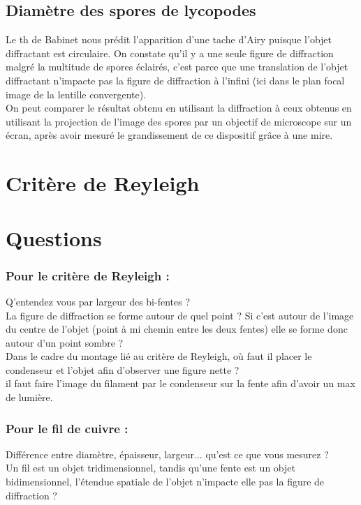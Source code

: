 \documentclass[12pt,prb,aps,epsf]{report}
\begin{document}
\subsection{Diamètre des spores de lycopodes}
Le th de Babinet nous prédit l'apparition d'une tache d'Airy puisque l'objet diffractant est circulaire. On constate qu'il y a une seule figure de diffraction malgré la multitude de spores éclairés, c'est parce que une translation de l'objet diffractant n'impacte pas la figure de diffraction à l'infini (ici dans le plan focal image de la lentille convergente).\\
On peut comparer le résultat obtenu en utilisant la diffraction à ceux obtenus en utilisant la projection de l'image des spores par un objectif de microscope sur un écran, après avoir mesuré le grandissement de ce dispositif grâce à une mire.

\section{Critère de Reyleigh}


\section{Questions}
\subsubsection{Pour le critère de Reyleigh :}
Q'entendez vous par largeur des bi-fentes ?\\

La figure de diffraction se forme autour de quel point ? Si c'est autour de l'image du centre de l'objet (point à mi chemin entre les deux fentes) elle se forme donc autour d'un point sombre ?\\

Dans le cadre du montage lié au critère de Reyleigh, où faut il placer le condenseur et l'objet afin d'observer une figure nette ?\\
il faut faire l'image du filament par le condenseur sur la fente afin d'avoir un max de lumière.

\subsubsection{Pour le fil de cuivre :}
Différence entre diamètre, épaisseur, largeur... qu'est ce que vous mesurez ?\\
Un fil est un objet tridimensionnel, tandis qu'une fente est un objet bidimensionnel, l'étendue spatiale de l'objet n'impacte elle pas la figure de diffraction ?
\end{document}

